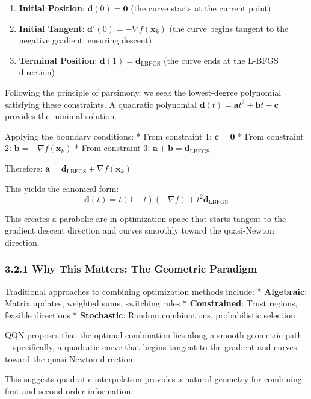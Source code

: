 \begin{enumerate}
\def\labelenumi{\arabic{enumi}.}
\item
  \textbf{Initial Position}: \(\mathbf{d}(0) = \mathbf{0}\) (the curve starts at the current point)
\item
  \textbf{Initial Tangent}: \(\mathbf{d}'(0) = -\nabla f(\mathbf{x}_k)\) (the curve begins tangent to the negative gradient, ensuring descent)
\item
  \textbf{Terminal Position}: \(\mathbf{d}(1) = \mathbf{d}_{\text{LBFGS}}\) (the curve ends at the L-BFGS direction)
\end{enumerate}

Following the principle of parsimony, we seek the lowest-degree polynomial satisfying these constraints.
A quadratic polynomial \(\mathbf{d}(t) = \mathbf{a}t^2 + \mathbf{b}t + \mathbf{c}\) provides the minimal solution.

Applying the boundary conditions:
* From constraint 1: \(\mathbf{c} = \mathbf{0}\)
* From constraint 2: \(\mathbf{b} = -\nabla f(\mathbf{x}_k)\)
* From constraint 3: \(\mathbf{a} + \mathbf{b} = \mathbf{d}_{\text{LBFGS}}\)

Therefore: \(\mathbf{a} = \mathbf{d}_{\text{LBFGS}} + \nabla f(\mathbf{x}_k)\)

This yields the canonical form:
\[\mathbf{d}(t) = t(1-t)(-\nabla f) + t^2 \mathbf{d}_{\text{LBFGS}}\]

This creates a parabolic arc in optimization space that starts tangent to the gradient descent direction and curves smoothly toward the quasi-Newton direction.

\hypertarget{why-this-matters-the-geometric-paradigm}{%
\subsubsection{3.2.1 Why This Matters: The Geometric Paradigm}\label{why-this-matters-the-geometric-paradigm}}

Traditional approaches to combining optimization methods include:
* \textbf{Algebraic}: Matrix updates, weighted sums, switching rules
* \textbf{Constrained}: Trust regions, feasible directions
* \textbf{Stochastic}: Random combinations, probabilistic selection

QQN proposes that the optimal combination lies along a smooth geometric path---specifically, a quadratic curve that begins tangent to the gradient and curves toward the quasi-Newton direction.

This suggests quadratic interpolation provides a natural geometry for combining first and second-order information.

